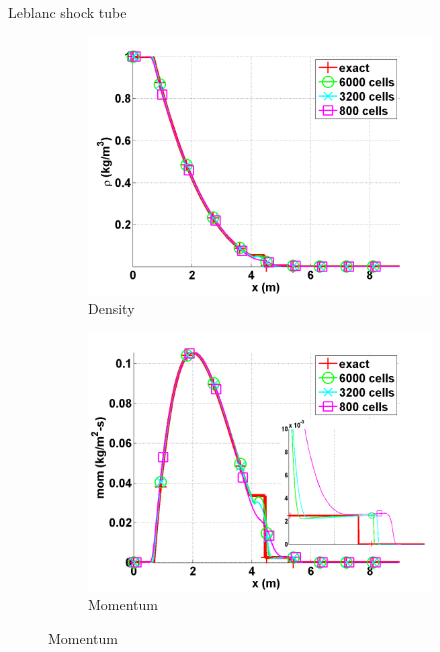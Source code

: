 \documentclass[xcolor=dvipsnames,10pt]{beamer}
\begin{document}
\begin{frame}{Leblanc shock tube}
\begin{figure}[H]
        \centering
        \begin{subfigure}[b]{0.37\textwidth}
                \centering
                \includegraphics[width=\textwidth]{../figures/Leblanc_exact_and_numerical_stt_density_6000.png}
                \caption{Density}
        \end{subfigure}%
        \begin{subfigure}[b]{0.37\textwidth}
                \centering
                \includegraphics[width=\textwidth]{../figures/Leblanc_exact_and_numerical_stt_momentum_6000.png}
                \caption{Momentum}
        \end{subfigure}


\end{figure}
\end{frame}
\end{document}
